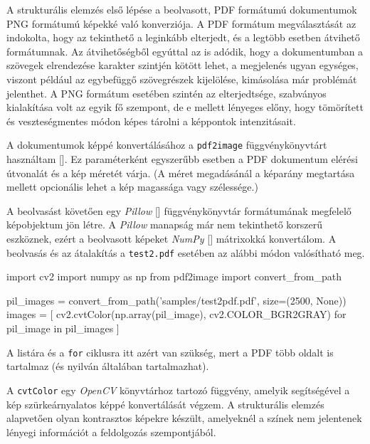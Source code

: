 \label{chap:ocr}

A strukturális elemzés első lépése a beolvasott, PDF formátumú dokumentumok PNG formátumú képekké való konverziója.
A PDF formátum megválasztását az indokolta, hogy az tekinthető a leginkább elterjedt, és a legtöbb esetben átvihető formátumnak.
Az átvihetőségből egyúttal az is adódik, hogy a dokumentumban a szövegek elrendezése karakter szintjén kötött lehet, a megjelenés ugyan egységes, viszont például az egybefüggő szövegrészek kijelölése, kimásolása már problémát jelenthet.
A PNG formátum esetében szintén az elterjedtsége, szabványos kialakítása volt az egyik fő szempont, de e mellett lényeges előny, hogy tömörített és veszteségmentes módon képes tárolni a képpontok intenzitásait.


A dokumentumok képpé konvertálásához a \texttt{pdf2image} függvénykönyvtárt használtam [].
Ez paraméterként egyszerűbb esetben a PDF dokumentum elérési útvonalát és a kép méretét várja.
(A méret megadásánál a képarány megtartása mellett opcionális lehet a kép magassága vagy szélessége.)

A beolvasást követően egy \textit{Pillow} [] függvénykönyvtár formátumának megfelelő képobjektum jön létre.
A \textit{Pillow} manapság már nem tekinthető korszerű eszköznek, ezért a beolvasott képeket \textit{NumPy} [] mátrixokká konvertálom.
A beolvasás és az átalakítás a \texttt{test2.pdf} esetében az alábbi módon valósítható meg.

\begin{python}
import cv2
import numpy as np
from pdf2image import convert_from_path

pil_images = convert_from_path('samples/test2pdf.pdf', size=(2500, None))
images = [
    cv2.cvtColor(np.array(pil_image), cv2.COLOR_BGR2GRAY)
    for pil_image in pil_images
]
\end{python}

A listára és a \texttt{for} ciklusra itt azért van szükség, mert a PDF több oldalt is tartalmaz (és nyilván általában tartalmazhat).

A \texttt{cvtColor} egy \textit{OpenCV} könyvtárhoz tartozó függvény, amelyik segítségével a kép szürkeárnyalatos képpé konvertálását végzem.
A strukturális elemzés alapvetően olyan kontrasztos képekre készült, amelyeknél a színek nem jelentenek lényegi információt a feldolgozás szempontjából.


